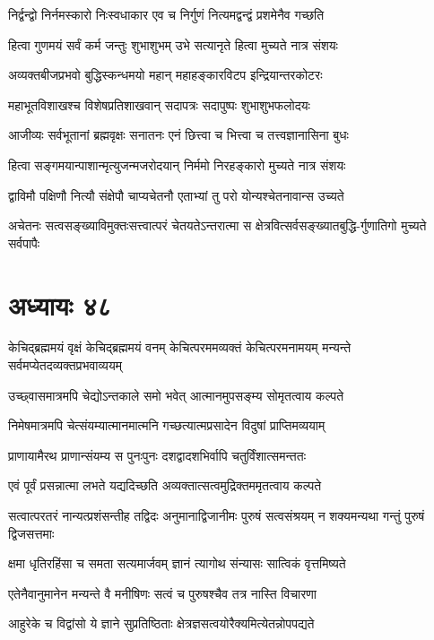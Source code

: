 \twolineshloka
{निर्द्वन्द्वो निर्नमस्कारो निःस्वधाकार एव च}
{निर्गुणं नित्यमद्वन्द्वं प्रशमेनैव गच्छति}


\twolineshloka
{हित्वा गुणमयं सर्वं कर्म जन्तुः शुभाशुभम्}
{उभे सत्यानृते हित्वा मुच्यते नात्र संशयः}


\twolineshloka
{अव्यक्तबीजप्रभवो बुद्धिस्कन्धमयो महान्}
{महाहङ्कारविटप इन्द्रियान्तरकोटरः}


\twolineshloka
{महाभूतविशाखश्च विशेषप्रतिशाखवान्}
{सदापत्रः सदापुष्पः शुभाशुभफलोदयः}


\twolineshloka
{आजीव्यः सर्वभूतानां ब्रह्मवृक्षः सनातनः}
{एनं छित्त्वा च भित्त्वा च तत्त्वज्ञानासिना बुधः}


\twolineshloka
{हित्वा सङ्गमयान्पाशान्मृत्युजन्मजरोदयान्}
{निर्ममो निरहङ्कारो मुच्यते नात्र संशयः}


\twolineshloka
{द्वाविमौ पक्षिणौ नित्यौ संक्षेपौ चाप्यचेतनौ}
{एताभ्यां तु परो योन्यश्चेतनावान्स उच्यते}


\twolineshloka
{अचेतनः सत्वसङ्ख्याविमुक्तःसत्त्वात्परं चेतयतेऽन्तरात्मा}
{स क्षेत्रवित्सर्वसङ्ख्यातबुद्धि-र्गुणातिगो मुच्यते सर्वपापैः}


\chapter{अध्यायः ४८}
\threelineshloka
{केचिद्ब्रह्ममयं वृक्षं केचिद्ब्रह्ममयं वनम्}
{केचित्परममव्यक्तं केचित्परमनामयम्}
{मन्यन्ते सर्वमप्येतदव्यक्तप्रभवाव्ययम्}


\twolineshloka
{उच्छ्वासमात्रमपि चेद्योऽन्तकाले समो भवेत्}
{आत्मानमुपसङ्म्य सोमृतत्वाय कल्पते}


\twolineshloka
{निमेषमात्रमपि चेत्संयम्यात्मानमात्मनि}
{गच्छत्यात्मप्रसादेन विदुषां प्राप्तिमव्ययाम्}


\twolineshloka
{प्राणायामैरथ प्राणान्संयम्य स पुनःपुनः}
{दशद्वादशभिर्वापि चतुर्विंशात्समन्ततः}


\twolineshloka
{एवं पूर्वं प्रसन्नात्मा लभते यद्यदिच्छति}
{अव्यक्तात्सत्वमुद्रिक्तममृतत्वाय कल्पते}


\threelineshloka
{सत्वात्परतरं नान्यत्प्रशंसन्तीह तद्विदः}
{अनुमानाद्विजानीमः पुरुषं सत्वसंश्रयम्}
{न शक्यमन्यथा गन्तुं पुरुषं द्विजसत्तमाः}


\twolineshloka
{क्षमा धृतिरहिंसा च समता सत्यमार्जवम्}
{ज्ञानं त्यागोथ संन्यासः सात्विकं वृत्तमिष्यते}


\twolineshloka
{एतेनैवानुमानेन मन्यन्ते वै मनीषिणः}
{सत्वं च पुरुषश्चैव तत्र नास्ति विचारणा}


\twolineshloka
{आहुरेके च विद्वांसो ये ज्ञाने सुप्रतिष्ठिताः}
{क्षेत्रज्ञसत्वयोरैक्यमित्येतन्नोपपद्यते}


